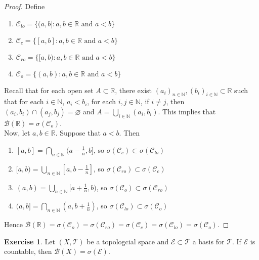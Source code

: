 \documentclass[12pt]{amsart}
\theoremstyle{definition}
\newtheorem{ex}[definition]{Exercise}
\newcommand{\sig}{\sigma}
\newcommand{\N}{\mathbb{N}}
\newcommand{\R}{\mathbb{R}}
\newcommand{\MC}{\mathcal{C}}
\newcommand{\MB}{\mathcal{B}}
\newcommand{\ME}{\mathcal{E}}
\newcommand{\MT}{\mathcal{T}}
\begin{document}
	\begin{proof}
		Define 
		\begin{enumerate}
			\item $\MC_{lo} = \{(a,b]:a,b \in \R \text{ and } a<b\}$\\
			\item $\MC_{c} = \{[a,b]:a,b \in \R \text{ and } a<b\}$\\
			\item $\MC_{ro} = \{[a,b):a,b \in \R \text{ and } a<b\}$\\
			\item $\MC_{o} = \{(a,b):a,b \in \R \text{ and } a<b\}$\\
		\end{enumerate} 
		Recall that for each open set $A \subset \R$, there exist $(a_i)_{n \in \N}, (b_i)_{i \in \N} \subset \R$ such that for each $i \in \N$, $a_i < b_i$, for each $i,j \in \N$, if $i \neq j$, then $(a_i,b_i) \cap (a_j, b_j) = \varnothing$ and $A = \bigcup\limits_{i \in \N}(a_i, b_i)$. This implies that $\MB(\R) = \sig(\MC_o)$. \vspace{2mm}\\
		Now, let $a,b \in \R$. Suppose that $a<b$. Then 
		\begin{enumerate}
			\item $[a,b] = \bigcap\limits_{n \in \N}(a- \frac{1}{n}, b]$, so $\sig(\MC_{c}) \subset \sig(\MC_{lo})$\\
			\item $[a,b) = \bigcup\limits_{n \in \N} [a,b-\frac{1}{n}]$, so $\sig(\MC_{ro}) \subset \sig(\MC_{c})$ \\
			\item $(a,b) = \bigcup\limits_{n \in \N} [a+\frac{1}{n},b)$, so $\sig(\MC_{o}) \subset \sig(\MC_{ro})$\\
			\item $(a,b] = \bigcap\limits_{n \in \N} (a,b+\frac{1}{n})$, so $\sig(\MC_{lo}) \subset \sig(\MC_{o})$\\
		\end{enumerate}
		Hence $\MB(\R) = \sig(\MC_o) = \sig(\MC_{ro}) = \sig(\MC_{c}) = \sig(\MC_{lo}) = \sig(\MC_{o})$. 
	\end{proof}

	\begin{ex}
		Let $(X, \MT)$ be a topologcial space and $\ME \subset \MT$ a basis for $\MT$. If $\ME$ is countable, then $\MB(X) = \sig(\ME)$.  
	\end{ex}
\end{document}
